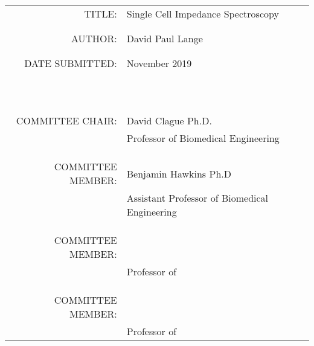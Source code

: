 \vspace{0.5 in}

\begin{tabular}{r l}
    TITLE:\;\;\;\;\; & Single Cell Impedance Spectroscopy\\
    \\
    \\
    AUTHOR:\;\;\;\;\; & David Paul Lange\\
    \\
    \\
    DATE SUBMITTED:\;\;\;\;\;\; & November 2019\\
    \\
    \\
    \\
    \\
    \\
    \\
    \\
    \\
    \\
    \\
    \\
    COMMITTEE CHAIR:\;\;\;\;\; & David Clague Ph.D.\\ 
    \;\;\;\;\; & Professor of Biomedical Engineering\\
    \\
    \\
    \\
    COMMITTEE MEMBER: \;\;\;\;\; & Benjamin Hawkins Ph.D\\
    \;\;\;\;\; & Assistant Professor of Biomedical Engineering\\
    \\
    \\
    \\
    COMMITTEE MEMBER: \;\;\;\;\; & \\
    \;\;\;\;\; & Professor of \\
    \\
    \\
    \\
    COMMITTEE MEMBER: \;\;\;\;\; & \\
    \;\;\;\;\; & Professor of \\
\end{tabular}


